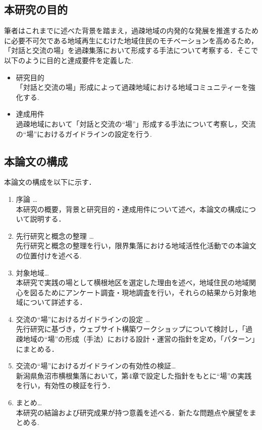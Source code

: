 \documentclass[a4paper]{jsarticle}
\begin{document}
\subsection{本研究の目的}
筆者はこれまでに述べた背景を踏まえ，過疎地域の内発的な発展を推進するために必要不可欠である地域再生にむけた地域住民のモチベーションを高めるため，「対話と交流の場」を過疎集落において形成する手法について考察する．そこで以下のように目的と達成要件を定義した.
\begin{itemize}
\item 研究目的　\\「対話と交流の場」形成によって過疎地域における地域コミュニティーを強化する.

\item 達成用件\\過疎地域において「対話と交流の“場”」形成する手法について考察し，交流の“場”におけるガイドラインの設定を行う.

\end{itemize}

\subsection{本論文の構成}
本論文の構成を以下に示す．
\begin{enumerate}
\item 序論 … \\本研究の概要，背景と研究目的・達成用件について述べ，本論文の構成について説明する．
\item 先行研究と概念の整理 … \\先行研究と概念の整理を行い，限界集落における地域活性化活動での本論文の位置付けを述べる.

\item 対象地域… \\本研究で実践の場として横根地区を選定した理由を述べ，地域住民の地域関心を図るためにアンケート調査・現地調査を行い，それらの結果から対象地域について詳述する．
\item 交流の“場”におけるガイドラインの設定 … \\先行研究に基づき，ウェブサイト構築ワークショップについて検討し，「過疎地域の“場”の形成（手法）における設計・運営の指針を定め，「パターン」にまとめる．

\item 交流の“場”におけるガイドラインの有効性の検証…\\新潟県魚沼市横根集落において，第4章で設定した指針をもとに“場”の実践を行い，有効性の検証を行う．
\item まとめ…\\本研究の結論および研究成果が持つ意義を述べる．新たな問題点や展望をまとめる.


\end{enumerate}
\end{document}
